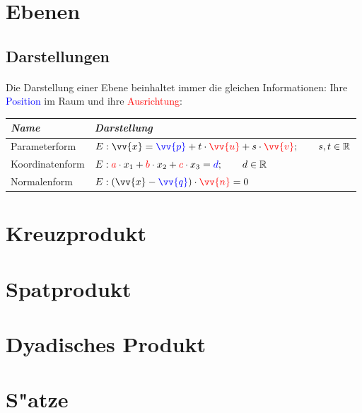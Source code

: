\section{Ebenen}

\subsection{Darstellungen}

    \paragraph{} Die Darstellung einer Ebene beinhaltet immer die gleichen Informationen: Ihre \textcolor{blue}{Position} im Raum und ihre
    \textcolor{red}{Ausrichtung}:\\
    \begin{center}
        \begin{tabular}{@{} *2l @{}}
            \emph{Name} & \emph{Darstellung}   \\\midrule
            Parameterform \qquad \qquad \qquad \qquad \qquad & $E:\vv{x}=\textcolor{blue}{\vv{p}} + t\cdot \textcolor{red}{\vv{u}} + s\cdot \textcolor{red}{\vv{v}} ; \qquad s,t \in \R $    \\
            Koordinatenform \qquad \qquad \qquad \qquad \qquad & $E: \textcolor{red}{a} \cdot x_{1} + \textcolor{red}{b} \cdot x_{2} + \textcolor{red}{c} \cdot x_{3} = \textcolor{blue}{d} ; \qquad d \in \mathbb{R} $ \\
            Normalenform \qquad \qquad \qquad \qquad \qquad & $E:(\vv{x} - \textcolor{blue}{\vv{q}}) \cdot \textcolor{red}{\vv{n}} = 0 $\\
        \end{tabular}
    \end{center}


\section{Kreuzprodukt}
\section{Spatprodukt}
\section{Dyadisches Produkt}
\section{S"atze}

